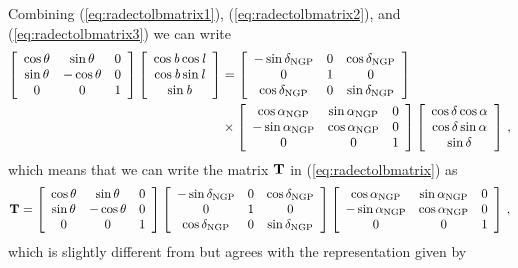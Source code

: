 Combining (\ref{eq:radectolbmatrix1}), (\ref{eq:radectolbmatrix2}), and (\ref{eq:radectolbmatrix3}) we can write
\begin{equation}
\begin{split}
\left[ \begin{array}{ccc} \cos \theta & \sin \theta & 0\\\sin \theta & -\cos \theta & 0\\0&0&1 \end{array} \right]
\left[ \begin{array}{c} \cos {\it b} \cos {\it l} \\ \cos {\it b} \sin {\it l} \\ \sin {\it b} \end{array} \right] & = 
\left[ \begin{array}{ccc} -\sin \delta_{\textnormal{NGP}} & 0 & \cos \delta_{\textnormal{NGP}}\\ 0 & 1 & 0 \\ \cos \delta_{\textnormal{NGP}} & 0 & \sin \delta_{\textnormal{NGP}}\end{array} \right] \\
& \times \left[ \begin{array}{ccc} \cos \alpha_{\textnormal{NGP}} &\sin\alpha_{\textnormal{NGP}}&0\\ -\sin\alpha_{\textnormal{NGP}} & \cos\alpha_{\textnormal{NGP}}&0\\ 0&0&1\end{array} \right]
\left[ \begin{array}{c} \cos \delta \cos \alpha \\ \cos \delta \sin \alpha \\ \sin \delta \end{array} \right]\, ,
\end{split}
\end{equation}
which means that we can write the matrix $\mathbf{T}$ in (\ref{eq:radectolbmatrix}) as
\begin{equation}\label{eq:radectolbT}
\mathbf{T} = \left[ \begin{array}{ccc} \cos \theta & \sin \theta & 0\\\sin \theta & -\cos \theta & 0\\0&0&1 \end{array} \right]
\left[ \begin{array}{ccc} -\sin \delta_{\textnormal{NGP}} & 0 & \cos \delta_{\textnormal{NGP}}\\ 0 & 1 & 0 \\ \cos \delta_{\textnormal{NGP}} & 0 & \sin \delta_{\textnormal{NGP}}\end{array} \right]
\left[ \begin{array}{ccc} \cos \alpha_{\textnormal{NGP}} &\sin\alpha_{\textnormal{NGP}}&0\\ -\sin\alpha_{\textnormal{NGP}} & \cos\alpha_{\textnormal{NGP}}&0\\ 0&0&1\end{array} \right]\, ,
\end{equation}
which is slightly different from but agrees with the representation
given by \citet{1987AJ.....93..864J}

